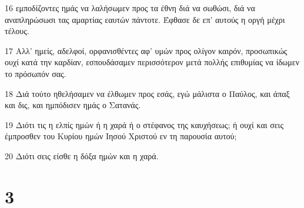 \par 16 εμποδίζοντες ημάς να λαλήσωμεν προς τα έθνη διά να σωθώσι, διά να αναπληρώσωσι τας αμαρτίας εαυτών πάντοτε. Έφθασε δε επ' αυτούς η οργή μέχρι τέλους.
\par 17 Αλλ' ημείς, αδελφοί, ορφανισθέντες αφ' υμών προς ολίγον καιρόν, προσωπικώς ουχί κατά την καρδίαν, εσπουδάσαμεν περισσότερον μετά πολλής επιθυμίας να ίδωμεν το πρόσωπόν σας.
\par 18 Διά τούτο ηθελήσαμεν να έλθωμεν προς εσάς, εγώ μάλιστα ο Παύλος, και άπαξ και δις, και ημπόδισεν ημάς ο Σατανάς.
\par 19 Διότι τις η ελπίς ημών ή η χαρά ή ο στέφανος της καυχήσεως; ή ουχί και σεις έμπροσθεν του Κυρίου ημών Ιησού Χριστού εν τη παρουσία αυτού;
\par 20 Διότι σεις είσθε η δόξα ημών και η χαρά.

\chapter{3}

